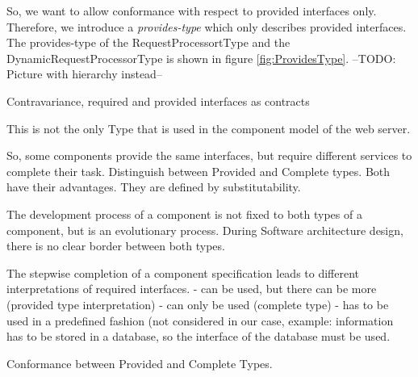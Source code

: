 So, we want to allow conformance with respect to provided interfaces only. Therefore, we introduce a \emph{provides-type} which only describes provided interfaces. The provides-type of the RequestProcessortType and the DynamicRequestProcessorType is shown in figure \ref{fig:ProvidesType}. --TODO: Picture with hierarchy instead--

Contravariance, required and provided interfaces as contracts

This is not the only Type that is used in the component model of the web server.

So, some components provide the same interfaces, but require different services to complete their task.
Distinguish between Provided and Complete types. Both have their advantages. They are defined by substitutability. 

The development process of a component is not fixed to both types of a component, but is an evolutionary process.
During Software architecture design, there is no clear border between both types.

The stepwise completion of a component specification leads to different interpretations of required interfaces.
-	can be used, but there can be more (provided type interpretation)
-	can only be used (complete type)
-	has to be used in a predefined fashion (not considered in our case, example: information has to be stored in a database, so the interface of the database must be used.

Conformance between Provided and Complete Types.
